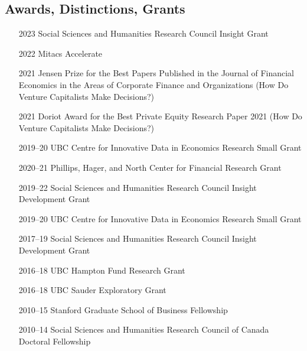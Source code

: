 \documentclass[11pt]{article}
\begin{document}
\subsection*{Awards, Distinctions, Grants}
\begin{itemize}
    \item[2023] Social Sciences and Humanities Research Council Insight Grant
    \item[2022] Mitacs Accelerate
    \item[2021] Jensen Prize for the Best Papers Published in the Journal of Financial Economics in the Areas of Corporate Finance and Organizations (How Do Venture Capitalists Make Decisions?)
    \item[2021] Doriot Award for the Best Private Equity Research Paper 2021 (How Do Venture Capitalists Make Decisions?)
    \item[2019--20] UBC Centre for Innovative Data in Economics Research Small Grant
    \item[2020--21] Phillips, Hager, and North Center for Financial Research Grant
    \item[2019--22] Social Sciences and Humanities Research Council Insight Development Grant
    \item[2019--20] UBC Centre for Innovative Data in Economics Research Small Grant
    \item[2017--19] Social Sciences and Humanities Research Council Insight Development Grant
    \item[2016--18] UBC Hampton Fund Research Grant
    \item[2016--18] UBC Sauder Exploratory Grant
    \item[2010--15] Stanford Graduate School of Business Fellowship
    \item[2010--14] Social Sciences and Humanities Research Council of Canada Doctoral Fellowship
\end{itemize}
\end{document}
